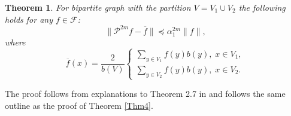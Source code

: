 \documentclass[a4paper,12pt]{amsart}
\newtheorem{theorem}{Theorem}
\theoremstyle{definition}
\renewcommand{\P}{\mathcal{P}}
\newcommand{\weight}{b}
\begin{document}
\begin{theorem}\label{Thm::bip}
For bipartite graph with the partition $V=V_1\cup V_2$ the following holds for any $f\in \mathcal F$:
 \begin{equation*}
\|\P^{2m} f - \overline f\|\preceq \alpha_1 ^{2m}\|f\|,
\end{equation*}
where
\begin{equation*}
\overline f(x)=\dfrac{2}{\weight (V)}
\begin{cases}
\sum_{y\in V_1} f(y)\weight (y),\; x\in V_1,\\
\sum_{y\in V_2} f(y)\weight (y),\; x\in V_2.
\end{cases}
\end{equation*}
\end{theorem}
The proof follows from explanations to Theorem 2.7 in \cite{Grigoryan} and follows the same outline as the proof of Theorem \ref{Thm4}.
\end{document}
